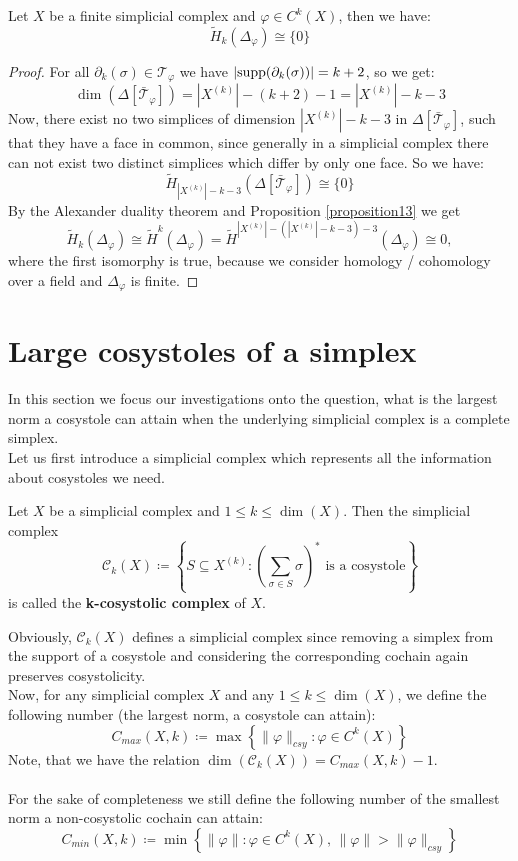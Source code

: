 \begin{thm}
Let \(X\) be a finite simplicial complex and \(\varphi\in C^k(X)\), then we have:
\[
\tilde{H}_k(\Delta_{\varphi})\cong\{0\}
\]
\begin{proof}
For all \(\partial_k(\sigma)\in\mathcal{T}_{\varphi}\) we have \(|\mathrm{supp}(\partial_k(\sigma))|=k+2\), so we get:
\[
\dim(\Delta[\bar{\mathcal{T}}_{\varphi}])=|X^{(k)}|-(k+2)-1=|X^{(k)}|-k-3
\]
Now, there exist no two simplices of dimension \(|X^{(k)}|-k-3\) in \(\Delta[\bar{\mathcal{T}}_{\varphi}]\), such that they have a face in common, since generally in a simplicial complex there can not exist two distinct simplices which differ by only one face. So we have:
\[
\tilde{H}_{|X^{(k)}|-k-3}(\Delta[\bar{\mathcal{T}}_{\varphi}])\cong\{0\}
\]
By the Alexander duality theorem and Proposition \ref{proposition13} we get
\[
\tilde{H}_k(\Delta_{\varphi})\cong\tilde{H}^k(\Delta_{\varphi})=\tilde{H}^{|X^{(k)}|-(|X^{(k)}|-k-3)-3}(\Delta_{\varphi})\cong 0,
\]
where the first isomorphy is true, because we consider homology / cohomology over a field and \(\Delta_{\varphi}\) is finite.
\end{proof}
\end{thm}

\section{Large cosystoles of a simplex}

In this section we focus our investigations onto the question, what is the largest norm a cosystole can attain when the underlying simplicial complex is a complete simplex.\\
Let us first introduce a simplicial complex which represents all the information about cosystoles we need.

\begin{defi}
Let \(X\) be a simplicial complex and \(1\leq k\leq \dim(X)\). Then the simplicial complex
\[
\mathcal{C}_k(X)\coloneqq \left\{S\subseteq X^{(k)}:\left(\sum\limits_{\sigma\in S}\sigma\right)^*\text{ is a cosystole}\right\}
\]
is called the \textbf{k-cosystolic complex} of \(X\).
\end{defi}

Obviously, \(\mathcal{C}_k(X)\) defines a simplicial complex since removing a simplex from the support of a cosystole and considering the corresponding cochain again preserves cosystolicity.\\
Now, for any simplicial complex \(X\) and any \(1\leq k\leq \dim(X)\), we define the following number (the largest norm, a cosystole can attain):
\[
C_{max}(X,k)\coloneqq \max\left\{\|\varphi\|_{csy}:\varphi\in C^k(X)\right\}
\]
Note, that we have the relation \(\dim(\mathcal{C}_k(X))=C_{max}(X,k)-1\).\\
\\
For the sake of completeness we still define the following number of the smallest norm a non-cosystolic cochain can attain:
\[
C_{min}(X,k)\coloneqq \min\left\{\|\varphi\|:\varphi\in C^k(X)\text{, }\|\varphi\|>\|\varphi\|_{csy}\right\}
\]

